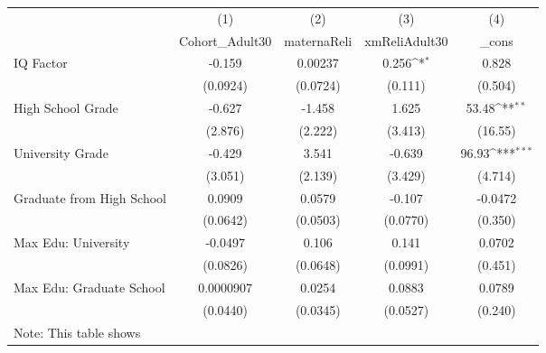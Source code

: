 {
\def\sym#1{\ifmmode^{#1}\else\(^{#1}\)\fi}
\begin{tabular}{l*{4}{c}}
\hline\hline
            &\multicolumn{1}{c}{(1)}&\multicolumn{1}{c}{(2)}&\multicolumn{1}{c}{(3)}&\multicolumn{1}{c}{(4)}\\
            &\multicolumn{1}{c}{Cohort\_Adult30}&\multicolumn{1}{c}{maternaReli}&\multicolumn{1}{c}{xmReliAdult30}&\multicolumn{1}{c}{\_cons}\\
\hline
IQ Factor   &      -0.159         &     0.00237         &       0.256\sym{*}  &       0.828         \\
            &    (0.0924)         &    (0.0724)         &     (0.111)         &     (0.504)         \\
[1em]
High School Grade&      -0.627         &      -1.458         &       1.625         &       53.48\sym{**} \\
            &     (2.876)         &     (2.222)         &     (3.413)         &     (16.55)         \\
[1em]
University Grade&      -0.429         &       3.541         &      -0.639         &       96.93\sym{***}\\
            &     (3.051)         &     (2.139)         &     (3.429)         &     (4.714)         \\
[1em]
Graduate from High School&      0.0909         &      0.0579         &      -0.107         &     -0.0472         \\
            &    (0.0642)         &    (0.0503)         &    (0.0770)         &     (0.350)         \\
[1em]
Max Edu: University&     -0.0497         &       0.106         &       0.141         &      0.0702         \\
            &    (0.0826)         &    (0.0648)         &    (0.0991)         &     (0.451)         \\
[1em]
Max Edu: Graduate School&   0.0000907         &      0.0254         &      0.0883         &      0.0789         \\
            &    (0.0440)         &    (0.0345)         &    (0.0527)         &     (0.240)         \\
\hline\hline
\multicolumn{5}{l}{\footnotesize Note: This table shows}\\
\end{tabular}
}
